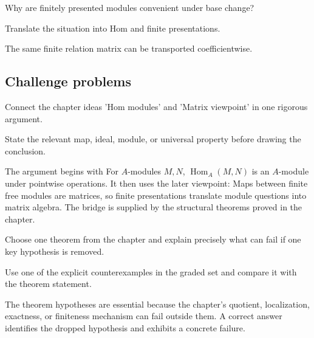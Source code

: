 \begin{exercise}\label{exr:v12-expand-14}
Why are finitely presented modules convenient under base change?
\end{exercise}
\begin{hint}
Translate the situation into Hom and finite presentations.
\end{hint}
\begin{solution}
The same finite relation matrix can be transported coefficientwise.
\end{solution}

\subsection*{Challenge problems}

\begin{exercise}\label{exr:v12-expand-15}
Connect the chapter ideas 'Hom modules' and 'Matrix viewpoint' in one rigorous argument.
\end{exercise}
\begin{hint}
State the relevant map, ideal, module, or universal property before drawing the conclusion.
\end{hint}
\begin{solution}
The argument begins with For $A$-modules $M,N$, $\operatorname{Hom}_A(M,N)$ is an $A$-module under pointwise operations. It then uses the later viewpoint: Maps between finite free modules are matrices, so finite presentations translate module questions into matrix algebra. The bridge is supplied by the structural theorems proved in the chapter.
\end{solution}

\begin{exercise}\label{exr:v12-expand-16}
Choose one theorem from the chapter and explain precisely what can fail if one key hypothesis is removed.
\end{exercise}
\begin{hint}
Use one of the explicit counterexamples in the graded set and compare it with the theorem statement.
\end{hint}
\begin{solution}
The theorem hypotheses are essential because the chapter's quotient, localization, exactness, or finiteness mechanism can fail outside them. A correct answer identifies the dropped hypothesis and exhibits a concrete failure.
\end{solution}

